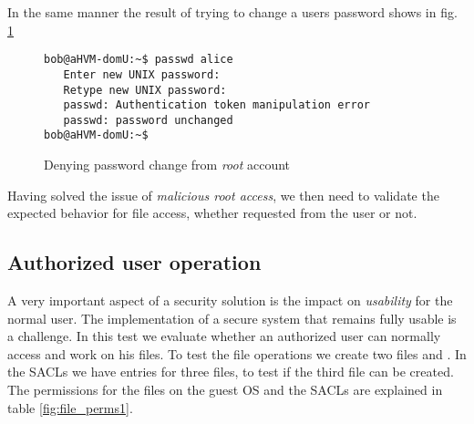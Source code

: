 \par In the same manner the result of trying to change a users password shows in fig. \ref{fig:passwd_deny}

\begin{figure}[ht]
	\centering
	\footnotesize{\selectfont 
		\begin{lstlisting}
bob@aHVM-domU:~$ passwd alice
   Enter new UNIX password:
   Retype new UNIX password:
   passwd: Authentication token manipulation error
   passwd: password unchanged
bob@aHVM-domU:~$
		\end{lstlisting}}
	\caption{Denying password change from \emph{root} account}
	\label{fig:passwd_deny}
\end{figure}


\par Having solved the issue of \emph{malicious root access}, we then need to validate the expected behavior for file access, whether requested from the  user or not.

\subsection{Authorized user operation}

\par A very important aspect of a security solution is the impact on \emph{usability} for the normal user. The implementation of a secure system that remains fully usable is a challenge. In this test we evaluate whether an authorized user can normally access and work on his files. To test the file operations we create two files  and . In the \acp{SACL} we have entries for three files, to test if the third file can be created. The permissions for the files on the guest \ac{OS} and the \acp{SACL} are explained in table \ref{fig:file_perms1}.

